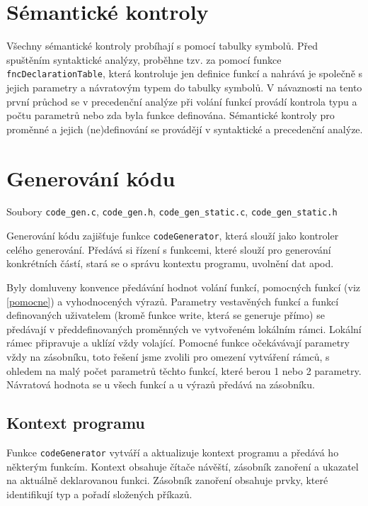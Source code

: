 \documentclass[a4paper, 12pt]{article}
\begin{document}
    \section{Sémantické kontroly}
    Všechny sémantické kontroly probíhají s pomocí tabulky symbolů. Před spuštěním syntaktické analýzy, proběhne tzv.  za pomocí funkce \texttt{fncDeclarationTable}, která kontroluje jen definice funkcí a nahrává je společně s jejich parametry a návratovým typem do tabulky symbolů. V návaznosti na tento první průchod se v precedenční analýze při volání funkcí provádí kontrola typu a počtu parametrů nebo zda byla funkce definována. Sémantické kontroly pro proměnné a jejich (ne)definování se provádějí v syntaktické a precedenční analýze.

    \section{Generování kódu} \label{generovani}
    Soubory \texttt{code\_gen.c}, \texttt{code\_gen.h}, \texttt{code\_gen\_static.c}, \texttt{code\_gen\_static.h}

    Generování kódu zajišťuje funkce \texttt{codeGenerator}, která slouží jako kontroler celého generování. Předává si řízení s funkcemi, které slouží pro generování konkrétních částí, stará se o správu kontextu programu, uvolnění dat apod.

    Byly domluveny konvence předávání hodnot volání funkcí, pomocných funkcí (viz \ref{pomocne}) a vyhodnocených výrazů. Parametry vestavěných funkcí a funkcí definovaných uživatelem (kromě funkce write, která se generuje přímo) se předávají v předdefinovaných proměnných ve vytvořeném lokálním rámci. Lokální rámec připravuje a uklízí vždy volající. Pomocné funkce očekávávají parametry vždy na zásobníku, toto řešení jsme zvolili pro omezení vytváření rámců, s ohledem na malý počet parametrů těchto funkcí, které berou 1 nebo 2 parametry. Návratová hodnota se u všech funkcí a u výrazů předává na zásobníku.

    \subsection{Kontext programu}
    Funkce \texttt{codeGenerator} vytváří a aktualizuje kontext programu a předává ho některým funkcím. Kontext obsahuje čítače návěští, zásobník zanoření a ukazatel na aktuálně deklarovanou funkci. Zásobník zanoření obsahuje prvky, které identifikují typ a pořadí složených příkazů.
\end{document}
